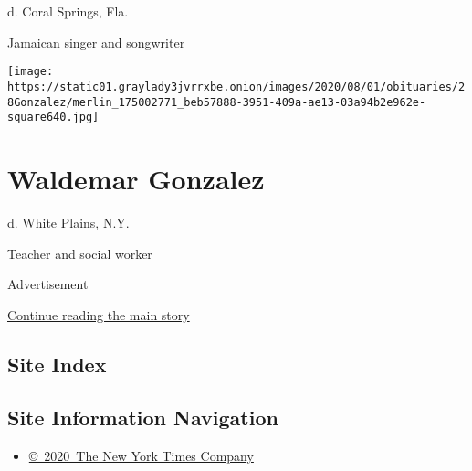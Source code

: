 d. Coral Springs, Fla.

Jamaican singer and songwriter

\texttt{[image: https://static01.graylady3jvrrxbe.onion/images/2020/08/01/obituaries/28Gonzalez/merlin\_175002771\_beb57888-3951-409a-ae13-03a94b2e962e-square640.jpg]}

\hypertarget{waldemar-gonzalez}{%
\section{Waldemar Gonzalez}\label{waldemar-gonzalez}}

d. White Plains, N.Y.

Teacher and social worker

Advertisement

\protect\hyperlink{after-bottom}{Continue reading the main story}

\hypertarget{site-index}{%
\subsection{Site Index}\label{site-index}}

\hypertarget{site-information-navigation}{%
\subsection{Site Information
Navigation}\label{site-information-navigation}}

\begin{itemize}
\tightlist
\item
  \href{https://help.nytimes3xbfgragh.onion/hc/en-us/articles/115014792127-Copyright-notice}{©~2020~The
  New York Times Company}
\end{itemize}

